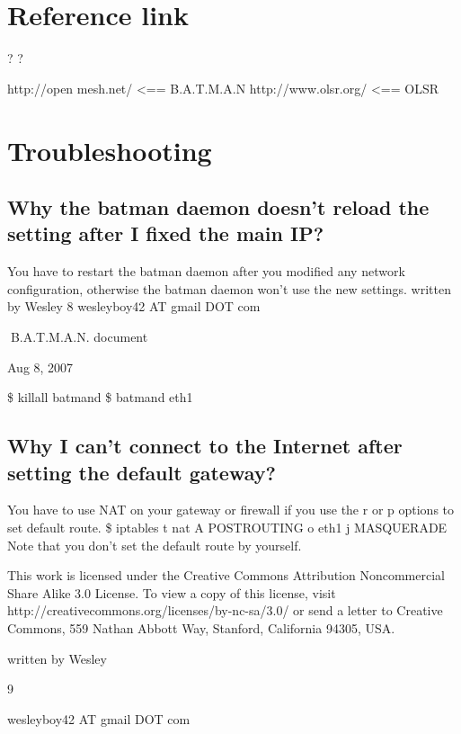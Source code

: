 \documentclass[
	12pt,
	a4paper,
	twoside,
	english,
	headsepline,
	footnosepline,
	automark,
	normalheadings,
	openany,
	cleardoubleplain,
	abstracton,
	idxtotoc,
	liststotoc,
	bibtotoc,
 	BCOR8mm,
]{scrartcl}
\begin{document}
\section{Reference link}
? ?

http://open mesh.net/ <== B.A.T.M.A.N http://www.olsr.org/ <== OLSR 

\section{Troubleshooting}
\subsection{Why the batman daemon doesn't reload the setting after I fixed the main IP?}
You have to restart the batman daemon after you modified any network configuration,  otherwise the batman daemon won't use the new settings.  written by Wesley 8 wesleyboy42 AT gmail DOT com

B.A.T.M.A.N. document

Aug 8, 2007

\$ killall batmand   \$ batmand eth1

\subsection{Why I can't connect to the Internet after setting the default gateway?}
You have to use NAT on your gateway or firewall if you use the  r or  p options to set default  route. \$ iptables  t nat  A POSTROUTING  o eth1  j MASQUERADE Note that you don't set the default route by yourself.

This work is licensed under the Creative Commons Attribution Noncommercial Share Alike 3.0 License. To 
view a copy of this license, visit http://creativecommons.org/licenses/by-nc-sa/3.0/ or send a letter to Creative  Commons, 559 Nathan Abbott Way, Stanford, California 94305, USA.

written by Wesley

9

wesleyboy42 AT gmail DOT com
\end{document}

